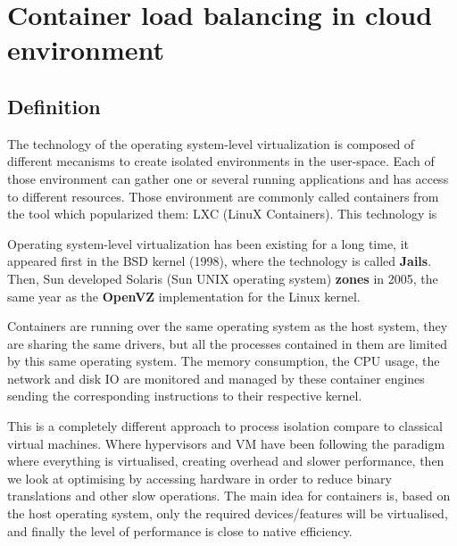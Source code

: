 \chapter{Container load balancing in cloud environment}
\label{mainidea}

\section{Definition}

The technology of the operating system-level virtualization is composed of
different mecanisms to create isolated environments in the user-space.  Each of
those environment can gather one or several running applications and has access
to different resources. Those environment are commonly called containers from
the tool which popularized them: LXC (LinuX Containers). This technology is 

Operating system-level virtualization has been existing for a long time, it
appeared first in the BSD kernel (1998), where the technology is called
\textbf{Jails}.  Then, Sun developed Solaris (Sun UNIX operating system)
\textbf{zones} in 2005, the same year as the \textbf{OpenVZ} implementation for
the Linux kernel.

Containers are running over the same operating system as the host system, they
are sharing the same drivers, but all the processes contained in them are
limited by this same operating system. The memory consumption, the CPU usage,
the network and disk IO are monitored and managed by these container engines
sending the corresponding instructions to their respective kernel. 

This is a completely different approach to process isolation compare to
classical virtual machines. Where hypervisors and VM have been following the
paradigm where everything is virtualised, creating overhead and slower
performance, then we look at optimising by accessing hardware in order to
reduce binary translations and other slow operations. The main idea for
containers is, based on the host operating system, only the required
devices/features will be virtualised, and finally the level of performance is
close to native efficiency.

